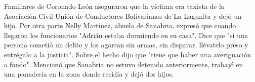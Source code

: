 \documentclass{article}%
\begin{document}
%
Familiares de Coronado León aseguraron que la víctima era taxista de la Asociación Civil Unión de Conductores Bolivarianos de La Lagunita y dejó un hijo.%
\newline%
%
Por otra parte Nelly Martínez, abuela de Sanabria, expresó que cuando llegaron los funcionarios "Adrián estaba durmiendo en su casa". Dice que "si una persona cometió un delito y los agarran sin armas, sin disparar, llévatelo preso y entrégalo a la justicia". Sobre el hecho  dijo que "tiene que haber una averiguación a fondo". \newline%
Mencionó que Sanabria no estuvo detenido anteriormente, trabajó en una panadería en  la zona donde residía y dejó dos hijos.%
\newline%
%
\end{document}
